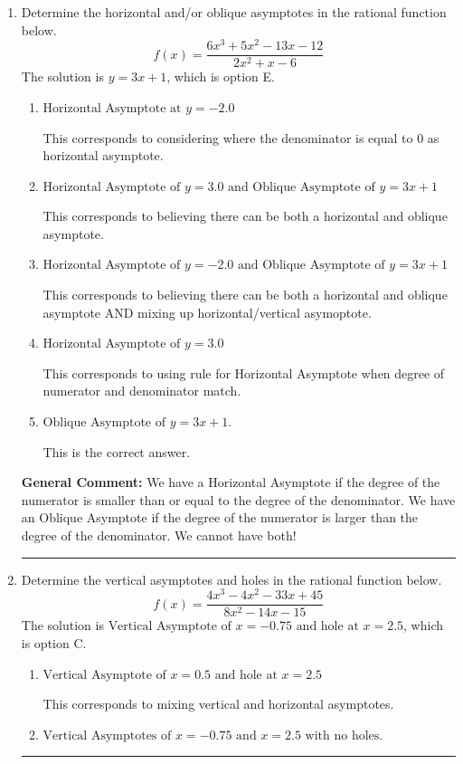 \documentclass{extbook}[14pt]
\newcommand{\litem}[1]{\item #1

\rule{\textwidth}{0.4pt}}
\begin{document}
\begin{enumerate}\litem{
Determine the horizontal and/or oblique asymptotes in the rational function below.
\[ f(x) = \frac{6x^{3} +5 x^{2} -13 x -12}{2x^{2} +x -6} \]The solution is \( y = 3x + 1 \), which is option E.\begin{enumerate}[label=\Alph*.]
\item \( \text{Horizontal Asymptote at } y = -2.0 \)

This corresponds to considering where the denominator is equal to 0 as horizontal asymptote.
\item \( \text{Horizontal Asymptote of } y = 3.0 \text{ and Oblique Asymptote of } y = 3x + 1 \)

This corresponds to believing there can be both a horizontal and oblique asymptote.
\item \( \text{Horizontal Asymptote of } y = -2.0 \text{ and Oblique Asymptote of } y = 3x + 1 \)

This corresponds to believing there can be both a horizontal and oblique asymptote AND mixing up horizontal/vertical asymoptote.
\item \( \text{Horizontal Asymptote of } y = 3.0  \)

This corresponds to using rule for Horizontal Asymptote when degree of numerator and denominator match.
\item \( \text{Oblique Asymptote of } y = 3x + 1. \)

This is the correct answer.
\end{enumerate}

\textbf{General Comment:} We have a Horizontal Asymptote if the degree of the numerator is smaller than or equal to the degree of the denominator. We have an Oblique Asymptote if the degree of the numerator is larger than the degree of the denominator. We cannot have both!
}
\litem{
Determine the vertical asymptotes and holes in the rational function below.
\[ f(x) = \frac{4x^{3} -4 x^{2} -33 x + 45}{8x^{2} -14 x -15} \]The solution is \( \text{Vertical Asymptote of } x = -0.75 \text{ and hole at } x = 2.5 \), which is option C.\begin{enumerate}[label=\Alph*.]
\item \( \text{Vertical Asymptote of } x = 0.5 \text{ and hole at } x = 2.5 \)

This corresponds to mixing vertical and horizontal asymptotes.
\item \( \text{Vertical Asymptotes of } x = -0.75 \text{ and } x = 2.5 \text{ with no holes.} \)


\end{enumerate}}
\end{enumerate}
\end{document}

